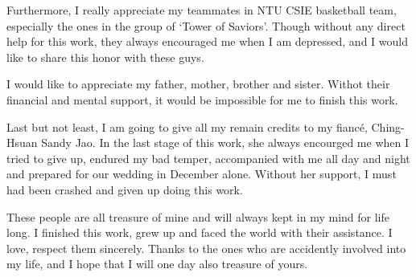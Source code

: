 \begin{acknowledgementsEN}
Furthermore, I really appreciate my teammates in NTU CSIE basketball
team, especially the ones in the group of `Tower of Saviors'.
Though without any direct help for this work, they always encouraged me
when I am depressed, and I would like to share this honor with these
guys.

I would like to appreciate my father, mother, brother and sister. Withot
their financial and mental support, it would be impossible for me to
finish this work.

Last but not least, I am going to give all my remain credits to my
fianc\'{e}, Ching-Hsuan Sandy Jao.
In the last stage of this work, she always encourged me when I tried to
give up, endured my bad temper, accompanied with me all day and night
and prepared for our wedding in December alone.
Without her support, I must had been crashed and given up doing this
work.

These people are all treasure of mine and will always kept in my mind
for life long.
I finished this work, grew up and faced the world with their assistance.
I love, respect them sincerely.
Thanks to the ones who are accidently involved into my life, and I hope
that I will one day also treasure of yours. 
\end{acknowledgementsEN}

